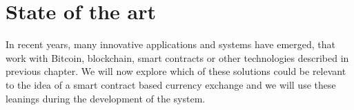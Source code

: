 \section{State of the art}
% 
In recent years, many innovative applications and systems have emerged, that work with Bitcoin, blockchain, smart contracts or other technologies described in previous chapter. We will now explore which of these solutions could be relevant to the idea of a smart contract based currency exchange and we will use these leanings during the development of the system.


% 
